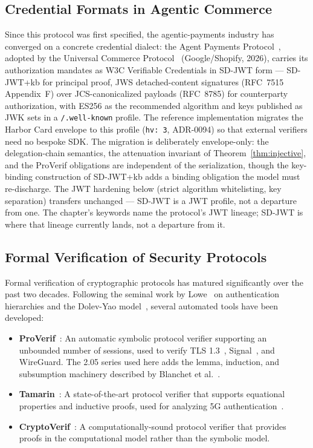 \documentclass[11pt,a4paper]{article}
\theoremstyle{definition}
\begin{document}
\subsection{Credential Formats in Agentic Commerce}\label{app:credential-formats}

Since this protocol was first specified, the agentic-payments industry has
converged on a concrete credential dialect: the Agent Payments
Protocol~\cite{ap2mandates2026}, adopted by the Universal Commerce
Protocol~\cite{ucp2026} (Google/Shopify, 2026), carries its authorization
mandates as W3C Verifiable Credentials in SD-JWT form --- SD-JWT+kb for
principal proof, JWS detached-content signatures (RFC~7515 Appendix~F) over
JCS-canonicalized payloads (RFC~8785) for counterparty authorization, with
ES256 as the recommended algorithm and keys published as JWK sets in a
\texttt{/.well-known} profile. The reference implementation migrates the
Harbor Card envelope to this profile (\texttt{hv:~3}, ADR-0094) so that
external verifiers need no bespoke SDK. The migration is deliberately
envelope-only: the delegation-chain semantics, the attenuation invariant of
Theorem~\ref{thm:injective}, and the ProVerif obligations are independent of
the serialization, though the key-binding construction of SD-JWT+kb adds a
binding obligation the model must re-discharge. The JWT hardening below
(strict algorithm whitelisting, key separation) transfers unchanged --- SD-JWT
is a JWT profile, not a departure from one. The chapter's keywords name the
protocol's JWT lineage; SD-JWT is where that lineage currently lands, not a
departure from it.

\subsection{Formal Verification of Security Protocols}

Formal verification of cryptographic protocols has matured significantly over the past two decades. Following the seminal work by Lowe~\cite{lowe1997hierarchy} on authentication hierarchies and the Dolev-Yao model~\cite{dolev1983security}, several automated tools have been developed:

\begin{itemize}
  \item \textbf{ProVerif}~\cite{blanchet2016modeling}: An automatic symbolic protocol verifier supporting an unbounded number of sessions, used to verify TLS 1.3~\cite{cremers2017comprehensive}, Signal~\cite{kobeissi2017automated}, and WireGuard. The 2.05 series used here adds the lemma, induction, and subsumption machinery described by Blanchet et al.~\cite{blanchet2017proverif}.

  \item \textbf{Tamarin}~\cite{meier2013tamarin}: A state-of-the-art protocol verifier that supports equational properties and inductive proofs, used for analyzing 5G authentication~\cite{basin2018formal}.

  \item \textbf{CryptoVerif}~\cite{blanchet2007cryptoverif}: A computationally-sound protocol verifier that provides proofs in the computational model rather than the symbolic model.
\end{itemize}
\end{document}
